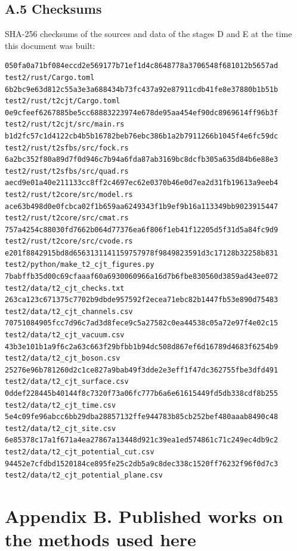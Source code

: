 \documentclass[
  10pt,
]{article}
\begin{document}
\hypertarget{a.5-checksums}{%
\subsection{A.5 Checksums}\label{a.5-checksums}}

SHA-256 checksums of the sources and data of the stages D and E at the
time this document was built:

\begin{verbatim}
050fa0a71bf084eccd2e569177b71ef1d4c8648778a3706548f681012b5657ad  test2/rust/Cargo.toml
6b2bc9e63d812c55a3e3a688434b73fc437a92e87911cdb41fe8e37880b1b51b  test2/rust/t2cjt/Cargo.toml
0e9cfeef6267885be5cc68883223974e678de95aa454ef90dc8969614ff96b3f  test2/rust/t2cjt/src/main.rs
b1d2fc57c1d4122cb4b5b16782beb76ebc386b1a2b7911266b1045f4e6fc59dc  test2/rust/t2sfbs/src/fock.rs
6a2bc352f80a89d7f0d946c7b94a6fda87ab3169bc8dcfb305a635d84b6e88e3  test2/rust/t2sfbs/src/quad.rs
aecd9e01a40e211133cc8ff2c4697ec62e0370b46e0d7ea2d31fb19613a9eeb4  test2/rust/t2core/src/model.rs
ace63b498d0e0fcbca02f1b659aa6249343f1b9ef9b16a113349bb9023915447  test2/rust/t2core/src/cmat.rs
757a4254c88030fd7662b064d77376ea6f806f1eb41f12205d5f31d5a84fc9d9  test2/rust/t2core/src/cvode.rs
e201f8842915bd8d6563131141159757978f9849823591d3c17128b32258b831  test2/python/make_t2_cjt_figures.py
7babffb35d00c69cfaaaf60a6930060966a16d7b6fbe830560d3859ad43ee072  test2/data/t2_cjt_checks.txt
263ca123c671375c7702b9dbde957592f2ecea71ebc82b1447fb53e890d75483  test2/data/t2_cjt_channels.csv
70751084905fcc7d96c7ad3d8fece9c5a27582c0ea44538c05a72e97f4e02c15  test2/data/t2_cjt_vacuum.csv
43b3e101b1a9f6c2a63c663f29bfbb1b94dc508d867ef6d16789d4683f6254b9  test2/data/t2_cjt_boson.csv
25276e96b781260d2c1ce827a9bab49f3dde2e3eff1f47dc362755fbe3dfd491  test2/data/t2_cjt_surface.csv
0ddef228445b40144f8c7320f73a06fc777b6a6e61615449fd5db338cdf8b255  test2/data/t2_cjt_time.csv
5e4c09fe96abcc6bb29dba28857132ffe944783b85cb252bef480aaab8490c48  test2/data/t2_cjt_site.csv
6e85378c17a1f671a4ea27867a13448d921c39ea1ed574861c71c249ec4db9c2  test2/data/t2_cjt_potential_cut.csv
94452e7cfdbd1520184ce895fe25c2db5a9c8dec338c1520ff76232f96f0d7c3  test2/data/t2_cjt_potential_plane.csv
\end{verbatim}

\hypertarget{appendix-b.-published-works-on-the-methods-used-here}{%
\section{Appendix B. Published works on the methods used
here}\label{appendix-b.-published-works-on-the-methods-used-here}}
\end{document}

